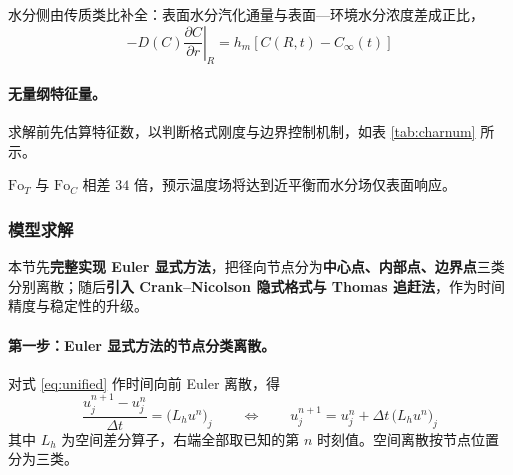 水分侧由传质类比补全：表面水分汽化通量与表面—环境水分浓度差成正比，
\begin{equation}
  -D(C)\left.\frac{\partial C}{\partial r}\right|_{R}=h_m\left[C(R,t)-C_\infty(t)\right]
  \label{eq:robinC}
\end{equation}

\paragraph{无量纲特征量。} 求解前先估算特征数，以判断格式刚度与边界控制机制，如表 \ref{tab:charnum} 所示。

\begin{table}[H]
  \centering
  \caption{无量纲特征量}
  \label{tab:charnum}
\end{table}

$\mathrm{Fo}_T$ 与 $\mathrm{Fo}_C$ 相差 $34$ 倍，预示温度场将达到近平衡而水分场仅表面响应。

\subsubsection{模型求解}
本节先\textbf{完整实现 Euler 显式方法}，把径向节点分为\textbf{中心点、内部点、边界点}三类分别离散；随后\textbf{引入 Crank--Nicolson 隐式格式与 Thomas 追赶法}，作为时间精度与稳定性的升级。

\paragraph{第一步：Euler 显式方法的节点分类离散。}
对式 \eqref{eq:unified} 作时间向前 Euler 离散，得
\begin{equation}
  \frac{u^{n+1}_j-u^{n}_j}{\Delta t}=\big(L_h u^n\big)_j
  \qquad\Longleftrightarrow\qquad
  u^{n+1}_j=u^{n}_j+\Delta t\,\big(L_h u^n\big)_j
  \label{eq:explicit}
\end{equation}
其中 $L_h$ 为空间差分算子，右端全部取已知的第 $n$ 时刻值。空间离散按节点位置分为三类。

